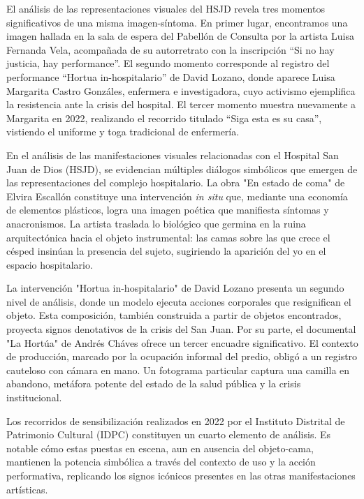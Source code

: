 El análisis de las representaciones visuales del HSJD revela tres momentos significativos de una misma imagen-síntoma. En primer lugar, encontramos una imagen hallada en la sala de espera del Pabellón de Consulta por la artista Luisa Fernanda Vela, acompañada de su autorretrato con la inscripción \enquote{Si no hay justicia, hay performance}. El segundo momento corresponde al registro del performance \enquote{Hortua in-hospitalario} de David Lozano, donde aparece Luisa Margarita Castro Gonzáles, enfermera e investigadora, cuyo activismo ejemplifica la resistencia ante la crisis del hospital. El tercer momento muestra nuevamente a Margarita en 2022, realizando el recorrido titulado \enquote{Siga esta es su casa}, vistiendo el uniforme y toga tradicional de enfermería.


En el análisis de las manifestaciones visuales relacionadas con el Hospital San Juan de Dios (HSJD), se evidencian múltiples diálogos simbólicos que emergen de las representaciones del complejo hospitalario. La obra "En estado de coma" de Elvira Escallón constituye una intervención \textit{in situ} que, mediante una economía de elementos plásticos, logra una imagen poética que manifiesta síntomas y anacronismos. La artista traslada lo biológico que germina en la ruina arquitectónica hacia el objeto instrumental: las camas sobre las que crece el césped insinúan la presencia del sujeto, sugiriendo la aparición del yo en el espacio hospitalario.

La intervención "Hortua in-hospitalario" de David Lozano presenta un segundo nivel de análisis, donde un modelo ejecuta acciones corporales que resignifican el objeto. Esta composición, también construida a partir de objetos encontrados, proyecta signos denotativos de la crisis del San Juan. Por su parte, el documental "La Hortúa" de Andrés Cháves ofrece un tercer encuadre significativo. El contexto de producción, marcado por la ocupación informal del predio, obligó a un registro cauteloso con cámara en mano. Un fotograma particular captura una camilla en abandono, metáfora potente del estado de la salud pública y la crisis institucional.

Los recorridos de sensibilización realizados en 2022 por el Instituto Distrital de Patrimonio Cultural (IDPC) constituyen un cuarto elemento de análisis. Es notable cómo estas puestas en escena, aun en ausencia del objeto-cama, mantienen la potencia simbólica a través del contexto de uso y la acción performativa, replicando los signos icónicos presentes en las otras manifestaciones artísticas.

